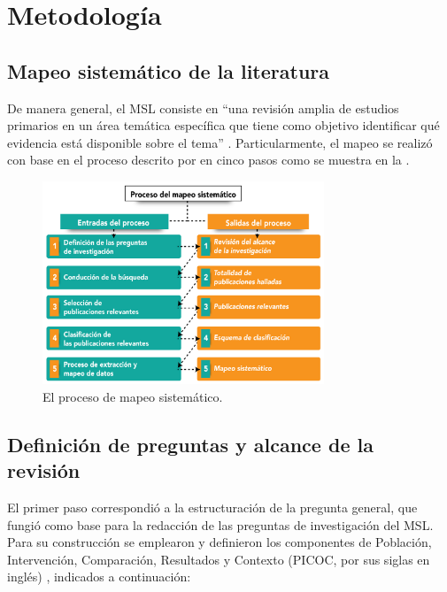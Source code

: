 \section{Metodología}\label{sec-metodologia}

\subsection{Mapeo sistemático de la literatura}\label{sub-sec-mapeo-sistematico-de-la-literatura}

De manera general, el MSL consiste en ``una revisión amplia de estudios
primarios en un área temática específica que tiene como objetivo
identificar qué evidencia está disponible sobre el tema'' \cite[p. VII]{Kitchenham2007}. Particularmente, el mapeo se realizó con base
en el proceso descrito por \textcite{Petersen2008SystematicMapping,PETERSEN20151} en cinco
pasos como se muestra en la .


\begin{figure}[htpb]
  \centering
  \caption{El proceso de mapeo sistemático.}
  \label{fig-01}
  \includegraphics[width=0.75\textwidth]{figure-01.png}
\end{figure}

\subsection{Definición de preguntas y alcance de la revisión}\label{sub-sec-definicion-de-preguntas-y-alcance-de-la-revision}

El primer paso correspondió a la estructuración de la pregunta general,
que fungió como base para la redacción de las preguntas de investigación
del MSL. Para su construcción se emplearon y definieron los componentes
de Población, Intervención, Comparación, Resultados y Contexto (PICOC,
por sus siglas en inglés) \cite{Kitchenham2007,Petticrew2006}, indicados a continuación:


